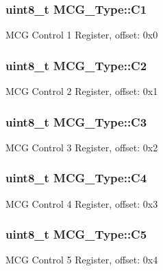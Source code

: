 \subsubsection[{\texorpdfstring{C1}{C1}}]{ uint8\+\_\+t M\+C\+G\+\_\+\+Type\+::\+C1}\hypertarget{structMCG__Type_a72de946c106d741e2e5f21c35988a7a1}{}\label{structMCG__Type_a72de946c106d741e2e5f21c35988a7a1}
M\+CG Control 1 Register, offset\+: 0x0 
\subsubsection[{\texorpdfstring{C2}{C2}}]{ uint8\+\_\+t M\+C\+G\+\_\+\+Type\+::\+C2}\hypertarget{structMCG__Type_a2a7672cdea44c417e9eaddd438fb3609}{}\label{structMCG__Type_a2a7672cdea44c417e9eaddd438fb3609}
M\+CG Control 2 Register, offset\+: 0x1 
\subsubsection[{\texorpdfstring{C3}{C3}}]{ uint8\+\_\+t M\+C\+G\+\_\+\+Type\+::\+C3}\hypertarget{structMCG__Type_a0c45cd85b1baf3e6a0a3a802e26cbe38}{}\label{structMCG__Type_a0c45cd85b1baf3e6a0a3a802e26cbe38}
M\+CG Control 3 Register, offset\+: 0x2 
\subsubsection[{\texorpdfstring{C4}{C4}}]{ uint8\+\_\+t M\+C\+G\+\_\+\+Type\+::\+C4}\hypertarget{structMCG__Type_ae8c2ac6766d7888e745befae1e0b39db}{}\label{structMCG__Type_ae8c2ac6766d7888e745befae1e0b39db}
M\+CG Control 4 Register, offset\+: 0x3 
\subsubsection[{\texorpdfstring{C5}{C5}}]{ uint8\+\_\+t M\+C\+G\+\_\+\+Type\+::\+C5}\hypertarget{structMCG__Type_ab94b0f073b5f69bc2cdfa61f7fd0a992}{}\label{structMCG__Type_ab94b0f073b5f69bc2cdfa61f7fd0a992}
M\+CG Control 5 Register, offset\+: 0x4 
